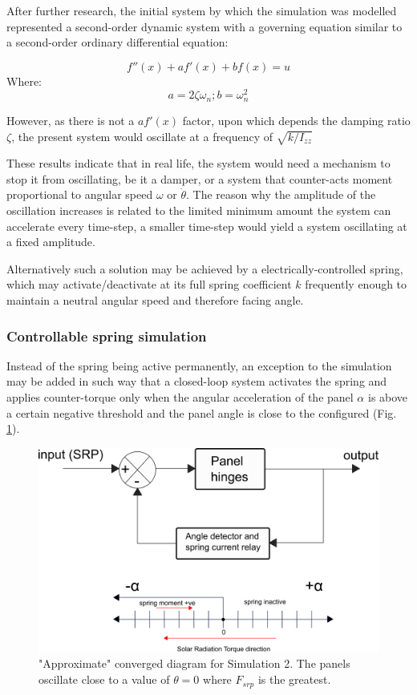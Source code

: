 After further research, the initial system by which the simulation was mo\-del\-led represented a second-order dynamic system with a governing equation similar to a second-order ordinary differential equation:

\begin{equation}
f''(x) + af'(x) + bf(x) = u \label{dyneq}
\end{equation}
Where:
$$a = 2 \zeta \omega_n ; b = \omega_n^2$$

However, as there is not a $af'(x)$ factor, upon which depends the damping ratio $\zeta$, the present system would oscillate at a frequency of $\sqrt{k/I_{zz}}$

These results indicate that in real life, the system would need a mechanism to stop it from oscillating, be it a damper, or a system that counter-acts moment proportional to angular speed $\omega$ or $\dot{\theta}$. The reason why the amplitude of the oscillation increases is related to the limited minimum amount the system can accelerate every time-step, a smaller time-step would yield a system oscillating at a fixed amplitude.

Alternatively such a solution may be achieved by a electrically-controlled spring, which may activate/deactivate at its full spring coefficient $k$ frequently enough to maintain a neutral angular speed and therefore facing angle.

\subsubsection{Controllable spring simulation}\label{res:controlspring}

Instead of the spring being active permanently, an exception to the simulation may be added in such way that a closed-loop system activates the spring and applies counter-torque only when the angular acceleration of the panel $\alpha$ is above a certain negative threshold and the panel angle is close to the configured (Fig. \ref{numberline}).

\begin{figure}[!htb]
\centering
\includegraphics[width=1\textwidth]{images/clsystem.png}
\caption{"Approximate" converged diagram for Simulation 2. The panels oscillate close to a value of $\theta = 0$ where $F_{srp}$ is the greatest.}
\label{numberline}
\end{figure}

